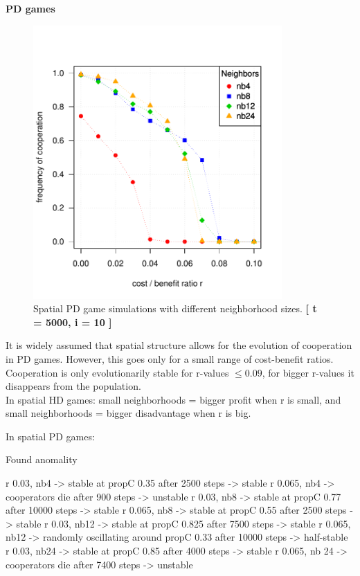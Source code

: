 \textbf{PD games} 


\begin{figure}[H]
	\centering 
	\includegraphics[width=9.5cm]{task2_multiplot}
	\caption{Spatial PD game simulations with different neighborhood sizes.  \textbf{[ t = 5000, i = 10 ]} }\label{fig: task2_multiplot}
\end{figure}


It is widely assumed that spatial structure allows for the evolution of cooperation in PD games. However, this goes only for a small range of cost-benefit ratios. Cooperation is only evolutionarily stable for r-values $ \leq 0.09$, for bigger r-values it disappears from the population.\\
 
In spatial HD games: small neighborhoods = bigger profit when r is small, and small neighborhoods = bigger disadvantage when r is big.

In spatial PD games: 

Found anomality

r 0.03, nb4 -> stable at propC 0.35 after 2500 steps -> stable
r 0.065, nb4 -> cooperators die after 900 steps -> unstable
r 0.03, nb8 -> stable at propC 0.77 after 10000 steps -> stable
r 0.065, nb8 -> stable at propC 0.55 after 2500 steps -> stable
r 0.03, nb12 -> stable at propC 0.825 after 7500 steps -> stable
r 0.065, nb12 -> randomly oscillating around propC 0.33 after 10000 steps -> half-stable
r 0.03, nb24 -> stable at propC 0.85 after 4000 steps -> stable
r 0.065, nb 24 -> cooperators die after 7400 steps -> unstable

